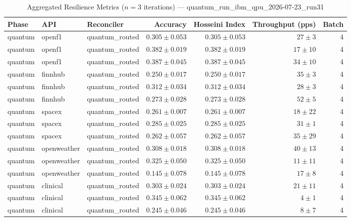 
\begin{table}[htbp]
\caption{Aggregated Resilience Metrics ($n=3$ iterations) --- quantum_run_ibm_qpu_2026-07-23_run31}
\begin{tabular}{l l l r r r r}
\hline
Phase & API & Reconciler & Accuracy & Hosseini Index & Throughput (pps) & Batch \\
\hline
quantum & openf1 & quantum\_routed & $0.305\pm0.053$ & $0.305\pm0.053$ & $27\pm3$ & 4 \\
quantum & openf1 & quantum\_routed & $0.382\pm0.019$ & $0.382\pm0.019$ & $17\pm10$ & 4 \\
quantum & openf1 & quantum\_routed & $0.387\pm0.045$ & $0.387\pm0.045$ & $34\pm10$ & 4 \\
quantum & finnhub & quantum\_routed & $0.250\pm0.017$ & $0.250\pm0.017$ & $35\pm3$ & 4 \\
quantum & finnhub & quantum\_routed & $0.312\pm0.034$ & $0.312\pm0.034$ & $28\pm3$ & 4 \\
quantum & finnhub & quantum\_routed & $0.273\pm0.028$ & $0.273\pm0.028$ & $52\pm5$ & 4 \\
quantum & spacex & quantum\_routed & $0.261\pm0.007$ & $0.261\pm0.007$ & $18\pm22$ & 4 \\
quantum & spacex & quantum\_routed & $0.285\pm0.025$ & $0.285\pm0.025$ & $31\pm1$ & 4 \\
quantum & spacex & quantum\_routed & $0.262\pm0.057$ & $0.262\pm0.057$ & $35\pm29$ & 4 \\
quantum & openweather & quantum\_routed & $0.308\pm0.018$ & $0.308\pm0.018$ & $40\pm13$ & 4 \\
quantum & openweather & quantum\_routed & $0.325\pm0.050$ & $0.325\pm0.050$ & $11\pm11$ & 4 \\
quantum & openweather & quantum\_routed & $0.145\pm0.078$ & $0.145\pm0.078$ & $17\pm8$ & 4 \\
quantum & clinical & quantum\_routed & $0.303\pm0.024$ & $0.303\pm0.024$ & $21\pm11$ & 4 \\
quantum & clinical & quantum\_routed & $0.345\pm0.062$ & $0.345\pm0.062$ & $4\pm1$ & 4 \\
quantum & clinical & quantum\_routed & $0.245\pm0.046$ & $0.245\pm0.046$ & $8\pm7$ & 4 \\

\end{tabular}
\end{table}
